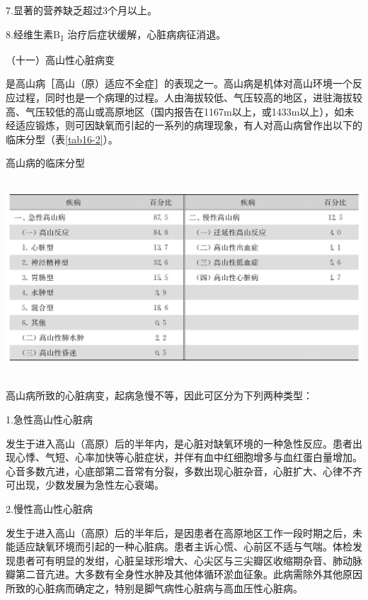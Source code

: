 7.显著的营养缺乏超过3个月以上。

8.经维生素B\textsubscript{1} 治疗后症状缓解，心脏病病征消退。

\hypertarget{text00139.htmlux5cux23CHP16-3-3-2-11}{}
（十一）高山性心脏病变

是高山病［高山（原）适应不全症］的表现之一。高山病是机体对高山环境一个反应过程，同时也是一个病理的过程。人由海拔较低、气压较高的地区，进驻海拔较高、气压较低的高山或高原地区（国内报告在1167m以上，或1433m以上），如未经适应锻炼，则可因缺氧而引起的一系列的病理现象，有人对高山病曾作出以下的临床分型（表\ref{tab16-2}）。

\begin{table}[htbp]
\centering
\caption{高山病的临床分型}
\label{tab16-2}
\includegraphics[width=5.94792in,height=2.875in]{./images/Image00102.jpg}
\end{table}

高山病所致的心脏病变，起病急慢不等，因此可区分为下列两种类型：

\hypertarget{text00139.htmlux5cux23CHP16-3-3-2-11-1}{}
1.急性高山性心脏病

发生于进入高山（高原）后的半年内，是心脏对缺氧环境的一种急性反应。患者出现心悸、气短、心率加快等心脏症状，并伴有血中红细胞增多与血红蛋白量增加。心音多数亢进，心底部第二音常有分裂，多数出现心脏杂音，心脏扩大、心律不齐可出现，少数发展为急性左心衰竭。

\hypertarget{text00139.htmlux5cux23CHP16-3-3-2-11-2}{}
2.慢性高山性心脏病

发生于进入高山（高原）后的半年后，是因患者在高原地区工作一段时期之后，未能适应缺氧环境而引起的一种心脏病。患者主诉心慌、心前区不适与气喘。体检发现患者可有明显的发绀，心脏呈球形增大、心尖区与三尖瓣区收缩期杂音、肺动脉瓣第二音亢进。大多数有全身性水肿及其他体循环淤血征象。此病需除外其他原因所致的心脏病而确定之，特别是脚气病性心脏病与高血压性心脏病。

